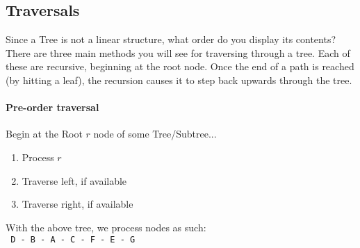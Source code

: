 \documentclass[a4paper,12pt,oneside]{book}
\begin{document}
    \newpage

    \subsection{Traversals}
    
        \begin{center}
        \end{center}

        Since a Tree is not a linear structure, what order do you
        display its contents? There are three main methods you
        will see for traversing through a tree. Each of these
        are recursive, beginning at the root node.
        Once the end of a path is reached (by hitting a leaf),
        the recursion causes it to step back upwards through the tree.

        \paragraph{Pre-order traversal}
            Begin at the Root $r$ node of some Tree/Subtree...
            
            \begin{enumerate}
                \item   Process $r$
                \item   Traverse left, if available
                \item   Traverse right, if available
            \end{enumerate}

            With the above tree, we process nodes as such: \\ \tab
            \texttt{ D - B - A - C - F - E - G }
\end{document}
